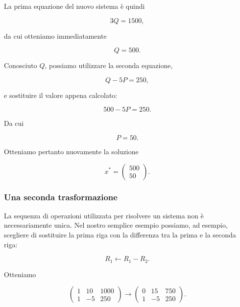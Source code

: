 La prima equazione del nuovo sistema è quindi

\begin{equation*}
    3Q=1500,
\end{equation*}

da cui otteniamo immediatamente

\begin{equation*}
    Q=500.
\end{equation*}

Conosciuto $Q$, possiamo utilizzare la seconda equazione,

\begin{equation*}
    Q-5P=250,
\end{equation*}

e sostituire il valore appena calcolato:

\begin{equation*}
    500-5P=250.
\end{equation*}

Da cui

\begin{equation*}
    P=50.
\end{equation*}

Otteniamo pertanto nuovamente la soluzione

\begin{equation*}
    x^*=
    \begin{pmatrix}
        500\\
        50
    \end{pmatrix}.
\end{equation*}


\subsubsection{Una seconda trasformazione}

La sequenza di operazioni utilizzata per risolvere un sistema non è
necessariamente unica. Nel nostro semplice esempio possiamo, ad
esempio, scegliere di sostituire la prima riga con la differenza tra
la prima e la seconda riga:

\begin{equation*}
    R_1 \leftarrow R_1-R_2.
\end{equation*}

Otteniamo

\begin{equation*}
    \left(
    \begin{array}{cc|c}
        1 & 10 & 1000\\
        1 & -5 & 250
    \end{array}
    \right)
    \longrightarrow
    \left(
    \begin{array}{cc|c}
        0 & 15 & 750\\
        1 & -5 & 250
    \end{array}
    \right).
\end{equation*}

